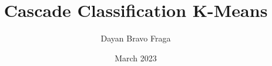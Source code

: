 \documentclass[24pt]{article}
\begin{document}
    \title{Cascade Classification K-Means}
    \date{March 2023}
    \author{Dayan Bravo Fraga}
    \maketitle
    
    \newpage
    
    \newpage
    
    \newpage
\end{document}
